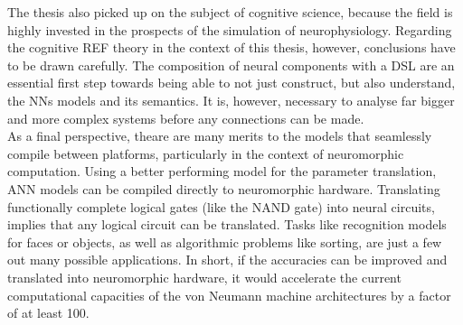 \documentclass[report.tex]{subfiles}
\begin{document}
The thesis also picked up on the subject of cognitive science, because the field
is highly invested in the prospects of the simulation of neurophysiology.
Regarding the cognitive REF theory in the context of this thesis, however,
conclusions have to be drawn carefully.
The composition of neural components with a \gls{DSL} are an essential first
step towards being able to not just construct, but also understand, the 
\glspl{NN} models and its semantics.
It is, however, necessary to analyse far bigger and more complex systems before
any connections can be made.
\\[0.1cm]

As a final perspective, theare are many merits to the models that seamlessly
compile between platforms, particularly in the context of neuromorphic
computation.
Using a better performing model for the parameter translation, \gls{ANN} models can
be compiled directly to neuromorphic hardware.
Translating functionally complete logical gates (like the NAND gate) into neural
circuits, implies that any logical circuit can be translated.
Tasks like recognition models for faces or objects, as well as algorithmic
problems like sorting, are just a few out many possible applications.
In short, if the accuracies can be improved and translated into neuromorphic hardware, it
would accelerate the current computational capacities of the von Neumann machine
architectures by a factor of at least 100.
\\[0.1cm]

\FloatBarrier
\end{document}
